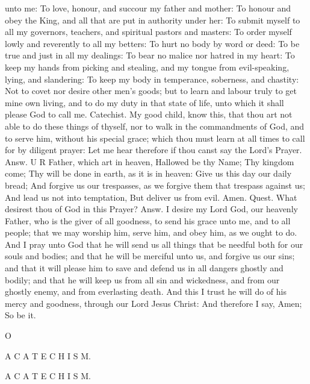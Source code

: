 unto me: To love, honour, and succour my father and mother: To honour and obey the King, and all that are put in authority under her: To submit myself to all my governors, teachers, and spiritual pastors and masters: To order myself lowly and reverently to all my betters: To hurt no body by word or deed: To be true and just in all my dealings: To bear no malice nor hatred in my heart: To keep my hands from picking and stealing, and my tongue from evil-speaking, lying, and slandering: To keep my body in temperance, soberness, and chastity: Not to covet nor desire other men’s goods; but to learn and labour truly to get mine own living, and to do my duty in that state of life, unto which it shall please God to call me. Catechist. My good child, know this, that thou art not able to do these things of thyself, nor to walk in the commandments of God, and to serve him, without his special grace; which thou must learn at all times to call for by diligent prayer: Let me hear therefore if thou canst say the Lord’s Prayer. Answ. U R Father, which art in heaven, Hallowed be thy Name; Thy kingdom come; Thy will be done in earth, as it is in heaven: Give us this day our daily bread; And forgive us our trespasses, as we forgive them that trespass against us; And lead us not into temptation, But deliver us from evil. Amen. Quest. What desirest thou of God in this Prayer? Answ. I desire my Lord God, our heavenly Father, who is the giver of all goodness, to send his grace unto me, and to all people; that we may worship him, serve him, and obey him, as we ought to do. And I pray unto God that he will send us all things that be needful both for our souls and bodies; and that he will be merciful unto us, and forgive us our sins; and that it will please him to save and defend us in all dangers ghostly and bodily; and that he will keep us from all sin and wickedness, and from our ghostly enemy, and from everlasting death. And this I trust he will do of his mercy and goodness, through our Lord Jesus Christ: And therefore I say, Amen; So be it.

O

A C A T E C H I S M.

A C A T E C H I S M.

